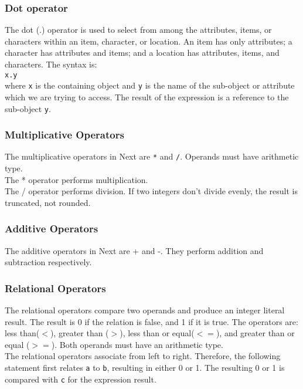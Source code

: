 \documentclass[12pt]{article}
\begin{document}
\subsubsection{Dot operator}
The dot (.) operator is used to select from among the attributes, items, or characters within an item, character, or location.  An item has only attributes; a character has attributes and items; and a location has attributes, items, and characters.  The syntax is: \\

\texttt{x.y} \\

\noindent where \texttt{x} is the containing object and \texttt{y} is the name of the sub-object or attribute which we are trying to access.  The result of the expression is a reference to the sub-object \texttt{y}.

\subsubsection{Multiplicative Operators}
The multiplicative operators in Next are \texttt{*} and \texttt{/}.  Operands must have arithmetic type. \\

\noindent The * operator performs multiplication. \\

\noindent The / operator performs division.  If two integers don't divide evenly, the result is truncated, not rounded.

\subsubsection{Additive Operators}
The additive operators in Next are + and -.  They perform addition and subtraction respectively.

\subsubsection{Relational Operators}
The relational operators compare two operands and produce an integer literal result.  The result is 0 if the relation is false, and 1 if it is true.  The operators are: less than($<$), greater than ($>$), less than or equal($<=$), and greater than or equal ($>=$).  Both operands must have an arithmetic type. \\

\noindent The relational operators associate from left to right.  Therefore, the following statement first relates \texttt{a} to \texttt{b}, resulting in either 0 or 1.  The resulting 0 or 1 is compared with \texttt{c} for the expression result. \\
\end{document}
